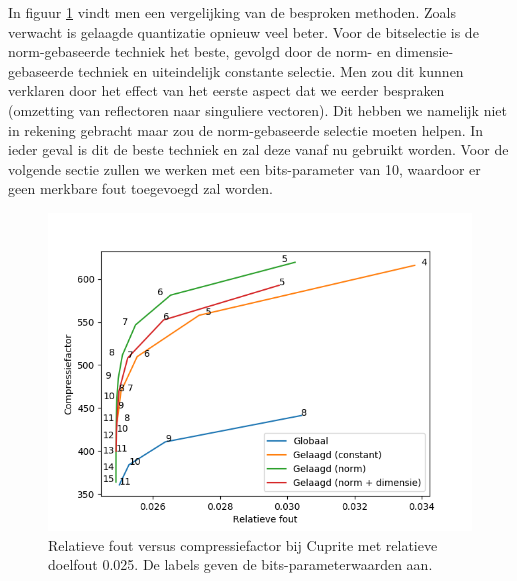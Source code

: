 In figuur \ref{fig:factor-matrix-quantization-comparison} vindt men een vergelijking van de besproken methoden. Zoals verwacht is gelaagde quantizatie opnieuw veel beter. Voor de bitselectie is de norm-gebaseerde techniek het beste, gevolgd door de norm- en dimensie-gebaseerde techniek en uiteindelijk constante selectie. Men zou dit kunnen verklaren door het effect van het eerste aspect dat we eerder bespraken (omzetting van reflectoren naar singuliere vectoren). Dit hebben we namelijk niet in rekening gebracht maar zou de norm-gebaseerde selectie moeten helpen. In ieder geval is dit de beste techniek en zal deze vanaf nu gebruikt worden. Voor de volgende sectie zullen we werken met een bits-parameter van 10, waardoor er geen merkbare fout toegevoegd zal worden.

\begin{figure}[H]
  \centering
  \includegraphics[scale=0.6]{images/factor_matrix_quantization_comparison.png}
  \caption{Relatieve fout versus compressiefactor bij Cuprite met relatieve doelfout 0.025. De labels geven de bits-parameterwaarden aan.}
\label{fig:factor-matrix-quantization-comparison}
\end{figure}